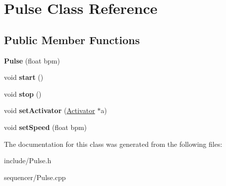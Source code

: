 \hypertarget{classPulse}{}\section{Pulse Class Reference}
\label{classPulse}
\subsection*{Public Member Functions}
\begin{DoxyCompactItemize}
\item 
{\bfseries Pulse} (float bpm)\hypertarget{classPulse_a9835b637db766732dd508c94fc30c501}{}\label{classPulse_a9835b637db766732dd508c94fc30c501}

\item 
void {\bfseries start} ()\hypertarget{classPulse_a164d81d4e1e798a5eec15b0b030b4047}{}\label{classPulse_a164d81d4e1e798a5eec15b0b030b4047}

\item 
void {\bfseries stop} ()\hypertarget{classPulse_a7c8121986bec5319bb097216fe5e93d0}{}\label{classPulse_a7c8121986bec5319bb097216fe5e93d0}

\item 
void {\bfseries set\+Activator} (\hyperlink{classActivator}{Activator} $\ast$a)\hypertarget{classPulse_a8283f4ab252e0c38b1e19a4dec522f23}{}\label{classPulse_a8283f4ab252e0c38b1e19a4dec522f23}

\item 
void {\bfseries set\+Speed} (float bpm)\hypertarget{classPulse_afc87b2e4120c47942cf03fc82aaf8002}{}\label{classPulse_afc87b2e4120c47942cf03fc82aaf8002}

\end{DoxyCompactItemize}


The documentation for this class was generated from the following files\+:\begin{DoxyCompactItemize}
\item 
include/Pulse.\+h\item 
sequencer/Pulse.\+cpp\end{DoxyCompactItemize}
